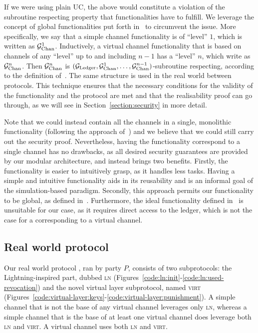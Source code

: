   If we were using plain UC, the above would constitute a violation of the
  subroutine respecting property that functionalities have to fulfill. We
  leverage the concept of global functionalities put forth
  in~\cite{DBLP:conf/tcc/BadertscherCHTZ20} to circumvent the issue. More
  specifically, we say that a simple channel functionality is of ``level'' $1$,
  which is written as $\mathcal{G}_{\mathrm{Chan}}^{1}$. Inductively, a virtual channel
  functionality that is based on channels of any ``level'' up to and including
  $n-1$ has a ``level'' $n$, which write as $\mathcal{G}_{\mathrm{Chan}}^{n}$. Then $\mathcal{G}_{\mathrm{Chan}}^{n}$
  is $(\mathcal{G}_{\mathrm{Ledger}}, \mathcal{G}_{\mathrm{Chan}}^{1}, \dots, \mathcal{G}_{\mathrm{Chan}}^{n-1})$-subroutine respecting,
  according to the definition of~\cite{DBLP:conf/tcc/BadertscherCHTZ20}. The
  same structure is used in the real world between protocols. This
  technique ensures that the necessary conditions for the validity of the
  functionality and the protocol are met and that the realisability proof can go
  through, as we will see in Section~\ref{section:security} in more detail.

  Note that we could instead contain all the channels in a single, monolithic
  functionality (following the approach of~\cite{DBLP:conf/csfw/KiayiasL20}) and
  we believe that we could still carry out the security proof. Nevertheless,
  having the functionality correspond to a single channel has no drawbacks, as
  all desired security guarantees are provided by our modular architecture, and
  instead brings two benefits. Firstly, the functionality is easier to
  intuitively grasp, as it handles less tasks. Having a simple and intuitive
  functionality aids in its reusability and is an informal goal of the
  simulation-based paradigm. Secondly, this approach permits our functionality
  to be global, as defined in~\cite{DBLP:conf/tcc/BadertscherCHTZ20}.
  Furthermore, the ideal functionality defined in~\cite{cryptoeprint:2020:476}
  is unsuitable for our case, as it requires direct access to the ledger, which
  is not the case for a \fchan corresponding to a virtual channel.

  \subsection{Real world protocol \pchan}
  Our real world protocol \pchan, ran by party $P$, consists of two
  subprotocols: the Lightning-inspired part, dubbed \textsc{ln}
  (Figures~\ref{code:ln:init}-\ref{code:ln:used-revocation}) and the novel
  virtual layer subprotocol, named \textsc{virt}
  (Figures~\ref{code:virtual-layer:keys}-\ref{code:virtual-layer:punishment}). A
  simple channel that is not the base of any virtual channel leverages only
  \textsc{ln}, whereas a simple channel that is the base of at least one virtual
  channel does leverage both \textsc{ln} and \textsc{virt}. A virtual channel
  uses both \textsc{ln} and \textsc{virt}.

